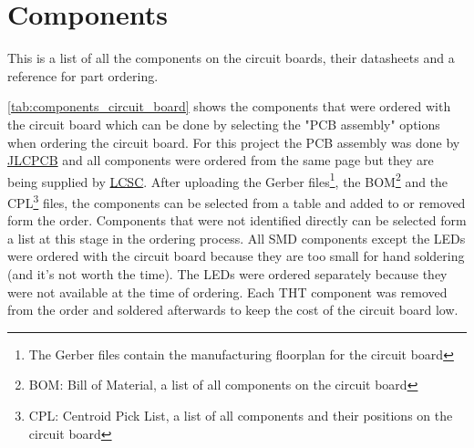 \section{Components}

This is a list of all the components on the circuit boards, their datasheets and a reference for part ordering.

\cref{tab:components_circuit_board} shows the components that were ordered with the circuit board which can be done by selecting the "PCB assembly" options when ordering the circuit board. For this project the PCB assembly was done by \href{https://jlcpcb.com/}{JLCPCB} and all components were ordered from the same page but they are being supplied by \href{https://lcsc.com/}{LCSC}. After uploading the Gerber files\footnote{The Gerber files contain the manufacturing floorplan for the circuit board}, the BOM\footnote{BOM: Bill of Material, a list of all components on the circuit board} and the CPL\footnote{CPL: Centroid Pick List, a list of all components and their positions on the circuit board} files, the components can be selected from a table and added to or removed form the order. Components that were not identified directly can be selected form a list at this stage in the ordering process. All SMD components except the LEDs were ordered with the circuit board because they are too small for hand soldering (and it's not worth the time). The LEDs were ordered separately because they were not available at the time of ordering. Each THT component was removed from the order and soldered afterwards to keep the cost of the circuit board low.


